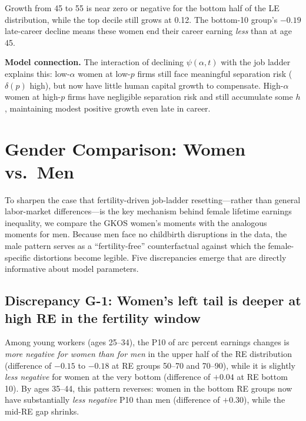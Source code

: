 \documentclass[11pt]{article}
\begin{document}
Growth from 45 to 55 is near zero or negative for the bottom half of the LE distribution, while the top decile still grows at 0.12. The bottom-10 group's $-0.19$ late-career decline means these women end their career earning \emph{less} than at age 45.

\medskip\noindent\textbf{Model connection.} The interaction of declining $\psi(\alpha, t)$ with the job ladder explains this: low-$\alpha$ women at low-$p$ firms still face meaningful separation risk ($\delta(p)$ high), but now have little human capital growth to compensate. High-$\alpha$ women at high-$p$ firms have negligible separation risk and still accumulate some $h$, maintaining modest positive growth even late in career.

\section{Gender Comparison: Women vs.\ Men}

To sharpen the case that fertility-driven job-ladder resetting---rather than general labor-market differences---is the key mechanism behind female lifetime earnings inequality, we compare the GKOS women's moments with the analogous moments for men. Because men face no childbirth disruptions in the data, the male pattern serves as a ``fertility-free'' counterfactual against which the female-specific distortions become legible. Five discrepancies emerge that are directly informative about model parameters.

\subsection{Discrepancy G-1: Women's left tail is deeper at high RE in the fertility window}

Among young workers (ages 25--34), the P10 of arc percent earnings changes is \emph{more negative for women than for men} in the upper half of the RE distribution (difference of $-0.15$ to $-0.18$ at RE groups 50--70 and 70--90), while it is slightly \emph{less negative} for women at the very bottom (difference of $+0.04$ at RE bottom 10). By ages 35--44, this pattern reverses: women in the bottom RE groups now have substantially \emph{less negative} P10 than men (difference of $+0.30$), while the mid-RE gap shrinks.
\end{document}
